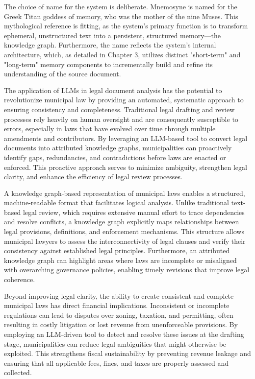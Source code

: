 The choice of name for the system is deliberate. Mnemosyne is named for the Greek Titan goddess of memory, who was the mother of the nine Muses. This mythological reference is fitting, as the system's primary function is to transform ephemeral, unstructured text into a persistent, structured memory—the knowledge graph. Furthermore, the name reflects the system's internal architecture, which, as detailed in Chapter 3, utilizes distinct "short-term" and "long-term" memory components to incrementally build and refine its understanding of the source document.

The application of LLMs in legal document analysis has the potential to revolutionize municipal law by providing an automated, systematic approach to ensuring consistency and completeness. Traditional legal drafting and review processes rely heavily on human oversight and are consequently susceptible to errors, especially in laws that have evolved over time through multiple amendments and contributors. By leveraging an LLM-based tool to convert legal documents into attributed knowledge graphs, municipalities can proactively identify gaps, redundancies, and contradictions before laws are enacted or enforced. This proactive approach serves to minimize ambiguity, strengthen legal clarity, and enhance the efficiency of legal review processes.

A knowledge graph-based representation of municipal laws enables a structured, machine-readable format that facilitates logical analysis. Unlike traditional text-based legal review, which requires extensive manual effort to trace dependencies and resolve conflicts, a knowledge graph explicitly maps relationships between legal provisions, definitions, and enforcement mechanisms. This structure allows municipal lawyers to assess the interconnectivity of legal clauses and verify their consistency against established legal principles. Furthermore, an attributed knowledge graph can highlight areas where laws are incomplete or misaligned with overarching governance policies, enabling timely revisions that improve legal coherence.

Beyond improving legal clarity, the ability to create consistent and complete municipal laws has direct financial implications. Inconsistent or incomplete regulations can lead to disputes over zoning, taxation, and permitting, often resulting in costly litigation or lost revenue from unenforceable provisions. By employing an LLM-driven tool to detect and resolve these issues at the drafting stage, municipalities can reduce legal ambiguities that might otherwise be exploited. This strengthens fiscal sustainability by preventing revenue leakage and ensuring that all applicable fees, fines, and taxes are properly assessed and collected.

